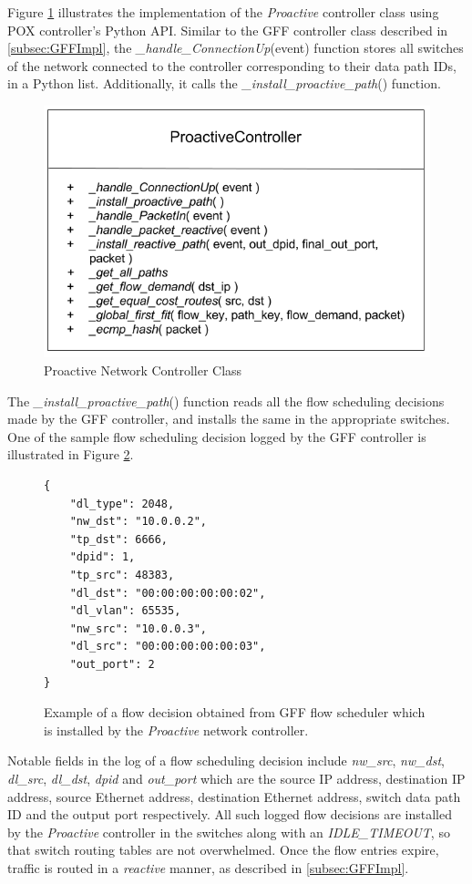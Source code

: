 Figure \ref{fig:ProactiveClass} illustrates the implementation of the \textit{Proactive} controller class using POX controller's Python API. Similar to the GFF controller class described in \ref{subsec:GFFImpl}, the \textit{\_handle\_ConnectionUp}(event) function stores all switches of the network connected to the controller corresponding to their data path IDs, in a Python list. Additionally, it calls the \textit{\_install\_proactive\_path}() function. 
\begin{figure}[!ht] 
	\centerline{\includegraphics[scale=0.42]{graphics/chapter5/ProactiveClass.png}}
	\caption{Proactive Network Controller Class}
	\label{fig:ProactiveClass}
\end{figure}

The \textit{\_install\_proactive\_path}() function reads all the flow scheduling decisions made by the GFF controller, and installs the same in the appropriate switches. One of the sample flow scheduling decision logged by the GFF controller is illustrated in Figure \ref{fig:FlowRule}.

\begin{figure}[!ht]
\begin{lstlisting}[style=json]
{   
	"dl_type": 2048, 
	"nw_dst": "10.0.0.2", 
	"tp_dst": 6666, 
	"dpid": 1, 
	"tp_src": 48383, 
	"dl_dst": "00:00:00:00:00:02", 
	"dl_vlan": 65535, 
	"nw_src": "10.0.0.3", 
	"dl_src": "00:00:00:00:00:03", 
	"out_port": 2
}
\end{lstlisting}
\caption{Example of a flow decision obtained from GFF flow scheduler which is installed by the \textit{Proactive} network controller.}
\label{fig:FlowRule}
\end{figure}

Notable fields in the log of a flow scheduling decision include \textit{nw\_src}, \textit{nw\_dst}, \textit{dl\_src}, \textit{dl\_dst}, \textit{dpid} and \textit{out\_port} which are the source IP address, destination IP address, source Ethernet address, destination Ethernet address, switch data path ID and the output port respectively. All such logged flow decisions are installed by the \textit{Proactive} controller in the switches along with an \textit{IDLE\_TIMEOUT}, so that switch routing tables are not overwhelmed. Once the flow entries expire, traffic is routed in a \textit{reactive} manner, as described in \ref{subsec:GFFImpl}.   


